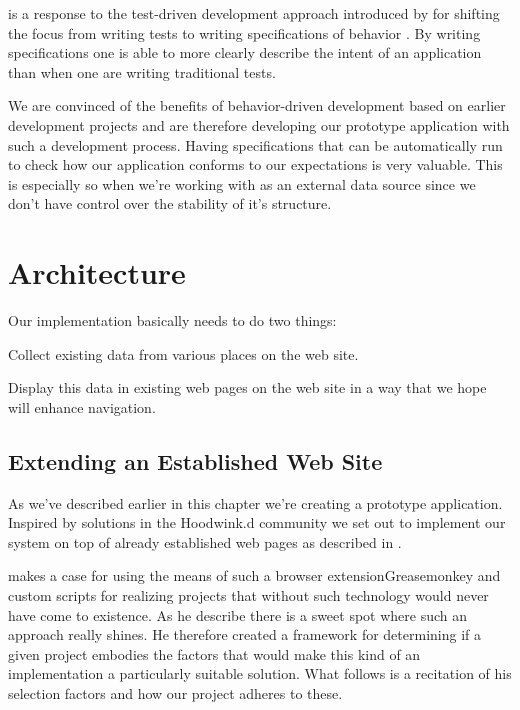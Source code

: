  is a response to the test-driven
development approach introduced by \citeauthor{north06} for shifting the focus
from writing tests to writing specifications of behavior
\citep{north06}. By writing specifications one is able to
more clearly describe the intent of an application than when one
are writing traditional tests.

We are convinced of the benefits of behavior-driven development based on
earlier development projects and are therefore developing our
prototype application with such a development process. Having specifications
that can be automatically run to check how our application conforms to our
expectations is very valuable. This is especially so when we're working
with \urort{} as an external data source since we don't have control over
the stability of it's structure.

\section{Architecture}
\label{section:implementation.architecture}

Our implementation basically needs to do two things:

\begin{enum}
  \item Collect existing data from various places on the \urort{} web site.
  \item Display this data in existing web pages on the \urort{} web site in
    a way that we hope will enhance navigation.
\end{enum}

\subsection{Extending an Established Web Site}

As we've described earlier in this chapter we're creating a prototype
application. Inspired by solutions in the Hoodwink.d community we set
out to implement our system on top of already established web pages as
described in .

\citet{laird07} makes a case for using the means of such a browser
extension\dash{}Greasemonkey\dash{} and custom scripts for
realizing projects that without such technology would
never have come to existence. As he describe there is a sweet spot where such
an approach really shines. He therefore created a framework for determining
if a given project embodies the factors that would make this kind of an
implementation a particularly suitable solution. What follows is a recitation
of his selection factors and how our project adheres to these.

